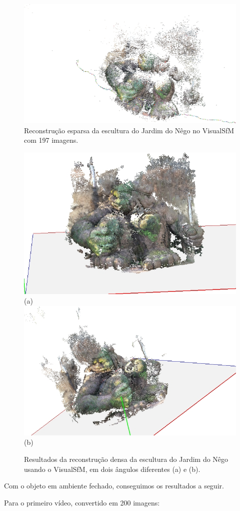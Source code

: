 \begin{figure}[!h]
	\centering
	\includegraphics[width=0.7\linewidth]{figs/guerreiroEsparsa.jpg}
	\caption{%
	Reconstrução esparsa da escultura do Jardim do Nêgo no VisualSfM com 197 imagens.
	}\label{fig:reconstrucaoEsparsaIndioVisualSFM}
\end{figure}

\newpage

\begin{figure}[!h]
	\centering
	\includegraphics[width=0.3\linewidth]{figs/guerreirovisualsfmdmr.jpg}(a)
	\includegraphics[width=0.3\linewidth]{figs/guerreirovisualsfmdmr2.jpg}(b)
	\caption{%
	Resultados da reconstrução densa da escultura do Jardim do Nêgo usando o VisualSfM, em dois ângulos diferentes (a) e (b).
	}\label{fig:reconstrucaoDensaIndioVisualSFM}
\end{figure}



Com o objeto em ambiente fechado, conseguimos os resultados a seguir. 

Para o primeiro vídeo, convertido em 200 imagens:


